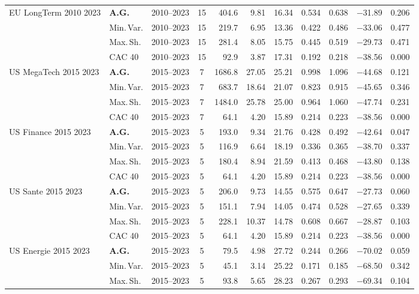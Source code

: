 \begin{longtable}{p{2.6cm} l c c r r r r r r r}
\midrule
EU LongTerm 2010 2023 & \textbf{A.G.} & 2010--2023 & 15 & 404.6 & 9.81 & 16.34 & 0.534 & 0.638 & $-$31.89 & 0.206 \\
 & Min.\,Var. & 2010--2023 & 15 & 219.7 & 6.95 & 13.36 & 0.422 & 0.486 & $-$33.06 & 0.477 \\
 & Max.\,Sh. & 2010--2023 & 15 & 281.4 & 8.05 & 15.75 & 0.445 & 0.519 & $-$29.73 & 0.471 \\
 & CAC 40 & 2010--2023 & 15 & 92.9 & 3.87 & 17.31 & 0.192 & 0.218 & $-$38.56 & 0.000 \\
\midrule
US MegaTech 2015 2023 & \textbf{A.G.} & 2015--2023 & 7 & 1686.8 & 27.05 & 25.21 & 0.998 & 1.096 & $-$44.68 & 0.121 \\
 & Min.\,Var. & 2015--2023 & 7 & 683.7 & 18.64 & 21.07 & 0.823 & 0.915 & $-$45.65 & 0.346 \\
 & Max.\,Sh. & 2015--2023 & 7 & 1484.0 & 25.78 & 25.00 & 0.964 & 1.060 & $-$47.74 & 0.231 \\
 & CAC 40 & 2015--2023 & 7 & 64.1 & 4.20 & 15.89 & 0.214 & 0.223 & $-$38.56 & 0.000 \\
\midrule
US Finance 2015 2023 & \textbf{A.G.} & 2015--2023 & 5 & 193.0 & 9.34 & 21.76 & 0.428 & 0.492 & $-$42.64 & 0.047 \\
 & Min.\,Var. & 2015--2023 & 5 & 116.9 & 6.64 & 18.19 & 0.336 & 0.365 & $-$38.70 & 0.337 \\
 & Max.\,Sh. & 2015--2023 & 5 & 180.4 & 8.94 & 21.59 & 0.413 & 0.468 & $-$43.80 & 0.138 \\
 & CAC 40 & 2015--2023 & 5 & 64.1 & 4.20 & 15.89 & 0.214 & 0.223 & $-$38.56 & 0.000 \\
\midrule
US Sante 2015 2023 & \textbf{A.G.} & 2015--2023 & 5 & 206.0 & 9.73 & 14.55 & 0.575 & 0.647 & $-$27.73 & 0.060 \\
 & Min.\,Var. & 2015--2023 & 5 & 151.1 & 7.94 & 14.05 & 0.474 & 0.528 & $-$27.65 & 0.339 \\
 & Max.\,Sh. & 2015--2023 & 5 & 228.1 & 10.37 & 14.78 & 0.608 & 0.667 & $-$28.87 & 0.103 \\
 & CAC 40 & 2015--2023 & 5 & 64.1 & 4.20 & 15.89 & 0.214 & 0.223 & $-$38.56 & 0.000 \\
\midrule
US Energie 2015 2023 & \textbf{A.G.} & 2015--2023 & 5 & 79.5 & 4.98 & 27.72 & 0.244 & 0.266 & $-$70.02 & 0.059 \\
 & Min.\,Var. & 2015--2023 & 5 & 45.1 & 3.14 & 25.22 & 0.171 & 0.185 & $-$68.50 & 0.342 \\
 & Max.\,Sh. & 2015--2023 & 5 & 93.8 & 5.65 & 28.23 & 0.267 & 0.293 & $-$69.34 & 0.104 \\

\end{longtable}
